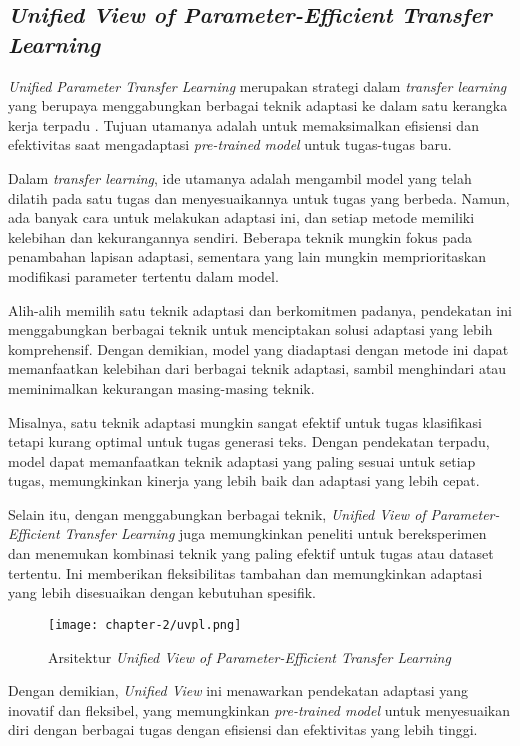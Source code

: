 \subsection{\textit{Unified View of Parameter-Efficient Transfer Learning}}

\textit{Unified Parameter Transfer Learning} merupakan strategi dalam \textit{transfer learning} yang berupaya menggabungkan berbagai teknik adaptasi ke dalam satu kerangka kerja terpadu \parencite{uvpl}. Tujuan utamanya adalah untuk memaksimalkan efisiensi dan efektivitas saat mengadaptasi \textit{pre-trained model} untuk tugas-tugas baru.

Dalam \textit{transfer learning}, ide utamanya adalah mengambil model yang telah dilatih pada satu tugas dan menyesuaikannya untuk tugas yang berbeda. Namun, ada banyak cara untuk melakukan adaptasi ini, dan setiap metode memiliki kelebihan dan kekurangannya sendiri. Beberapa teknik mungkin fokus pada penambahan lapisan adaptasi, sementara yang lain mungkin memprioritaskan modifikasi parameter tertentu dalam model.

Alih-alih memilih satu teknik adaptasi dan berkomitmen padanya, pendekatan ini menggabungkan berbagai teknik untuk menciptakan solusi adaptasi yang lebih komprehensif. Dengan demikian, model yang diadaptasi dengan metode ini dapat memanfaatkan kelebihan dari berbagai teknik adaptasi, sambil menghindari atau meminimalkan kekurangan masing-masing teknik.

Misalnya, satu teknik adaptasi mungkin sangat efektif untuk tugas klasifikasi tetapi kurang optimal untuk tugas generasi teks. Dengan pendekatan terpadu, model dapat memanfaatkan teknik adaptasi yang paling sesuai untuk setiap tugas, memungkinkan kinerja yang lebih baik dan adaptasi yang lebih cepat.

Selain itu, dengan menggabungkan berbagai teknik, \textit{Unified View of Parameter-Efficient Transfer Learning} juga memungkinkan peneliti untuk bereksperimen dan menemukan kombinasi teknik yang paling efektif untuk tugas atau dataset tertentu. Ini memberikan fleksibilitas tambahan dan memungkinkan adaptasi yang lebih disesuaikan dengan kebutuhan spesifik.

\begin{figure}[ht]
    \centering
    \texttt{[image: chapter-2/uvpl.png]}
    \caption{Arsitektur \textit{Unified View of Parameter-Efficient Transfer Learning} \parencite{uvpl}}
    \label{fig:uvpl}
\end{figure}

Dengan demikian, \textit{Unified View} ini menawarkan pendekatan adaptasi yang inovatif dan fleksibel, yang memungkinkan \textit{pre-trained model} untuk menyesuaikan diri dengan berbagai tugas dengan efisiensi dan efektivitas yang lebih tinggi.